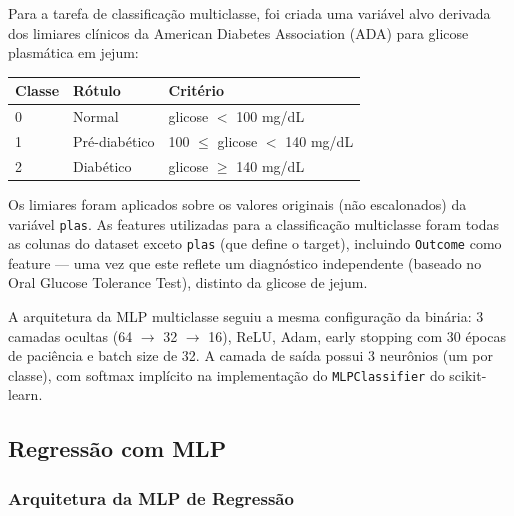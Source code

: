 \documentclass[12pt]{article}
\begin{document}
Para a tarefa de classificação multiclasse, foi criada uma variável alvo derivada dos limiares clínicos da American Diabetes Association (ADA) para glicose plasmática em jejum:

\begin{table}[ht]
\centering
\begin{tabularx}{\textwidth}{|l|l|X|}
\hline
Classe & Rótulo & Critério \\
\hline
0 & Normal & glicose $<$ 100 mg/dL \\
\hline
1 & Pré-diabético & 100 $\leq$ glicose $<$ 140 mg/dL \\
\hline
2 & Diabético & glicose $\geq$ 140 mg/dL \\
\hline
\end{tabularx}
\end{table}


Os limiares foram aplicados sobre os valores originais (não escalonados) da variável \texttt{plas}. As features utilizadas para a classificação multiclasse foram todas as colunas do dataset exceto \texttt{plas} (que define o target), incluindo \texttt{Outcome} como feature --- uma vez que este reflete um diagnóstico independente (baseado no Oral Glucose Tolerance Test), distinto da glicose de jejum.

A arquitetura da MLP multiclasse seguiu a mesma configuração da binária: 3 camadas ocultas (64 $\to$ 32 $\to$ 16), ReLU, Adam, early stopping com 30 épocas de paciência e batch size de 32. A camada de saída possui 3 neurônios (um por classe), com softmax implícito na implementação do \texttt{MLPClassifier} do scikit-learn.

\subsection{Regressão com MLP}

\subsubsection{Arquitetura da MLP de Regressão}
\end{document}
